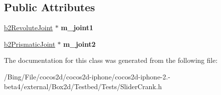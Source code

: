 \subsection*{Public Attributes}
\begin{DoxyCompactItemize}
\item 
\hypertarget{class_slider_crank_a81ece964529e9207f2717f7a4be7fcff}{\hyperlink{classb2_revolute_joint}{b2\-Revolute\-Joint} $\ast$ {\bfseries m\-\_\-joint1}}\label{class_slider_crank_a81ece964529e9207f2717f7a4be7fcff}

\item 
\hypertarget{class_slider_crank_a0b5773f21dea686260cbb6d4062f9b7e}{\hyperlink{classb2_prismatic_joint}{b2\-Prismatic\-Joint} $\ast$ {\bfseries m\-\_\-joint2}}\label{class_slider_crank_a0b5773f21dea686260cbb6d4062f9b7e}

\end{DoxyCompactItemize}


The documentation for this class was generated from the following file\-:\begin{DoxyCompactItemize}
\item 
/\-Bing/\-File/cocos2d/cocos2d-\/iphone/cocos2d-\/iphone-\/2.-\/beta4/external/\-Box2d/\-Testbed/\-Tests/Slider\-Crank.\-h\end{DoxyCompactItemize}
